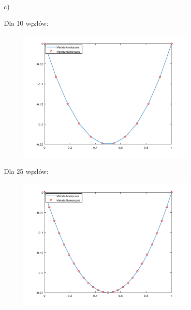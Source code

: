 \newpage
c)\\
\begin{samepage}
    Dla 10 węzłów:
    
    
    
    \FloatBarrier
    \begin{figure}[!ht]
        \begin{center}
            \includegraphics[width=0.8\textwidth]{Lab4/charts/zad3/zad3_n_10.png}
        \end{center}
    \end{figure}
    \FloatBarrier
\end{samepage}

\begin{samepage}
    Dla 25 węzłów:
    \begin{figure}[!ht]
        \begin{center}
            \includegraphics[width=0.8\textwidth]{Lab4/charts/zad3/zad3_n_25.png}
        \end{center}
    \end{figure}
    \FloatBarrier
\end{samepage}

